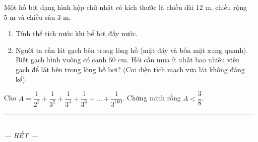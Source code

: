 \documentclass[12pt,a4paper]{article}
\begin{document}
\begin{ex}
Một hồ bơi dạng hình hộp chữ nhật có kích thước là chiều dài $12\text{ m}$, chiều rộng $5\text{ m}$ và chiều sâu $3\text{ m}$.
\begin{enumerate}[label=\textbf{\alph*)}, leftmargin=0.8cm, itemsep=1pt]
\item Tính thể tích nước khi bể bơi đầy nước.
\item Người ta cần lát gạch bên trong lòng hồ (mặt đáy và bốn mặt xung quanh). Biết gạch hình vuông có cạnh $50\text{ cm}$. Hỏi cần mua ít nhất bao nhiêu viên gạch để lát bên trong lòng hồ bơi? (Coi diện tích mạch vữa lát không đáng kể).
\end{enumerate}
\end{ex}
\vspace{2mm}

\begin{ex}
Cho $A = \dfrac{1}{2^2} + \dfrac{1}{3^2} + \dfrac{1}{3^4} + \dfrac{1}{3^6} + \ldots + \dfrac{1}{3^{100}}$. Chứng minh rằng $A < \dfrac{3}{8}$.
\end{ex}
\vspace{2mm}


\begin{center}
\rule{4cm}{0.4pt}\\
\textit{--- HẾT ---}
\end{center}
\end{document}
